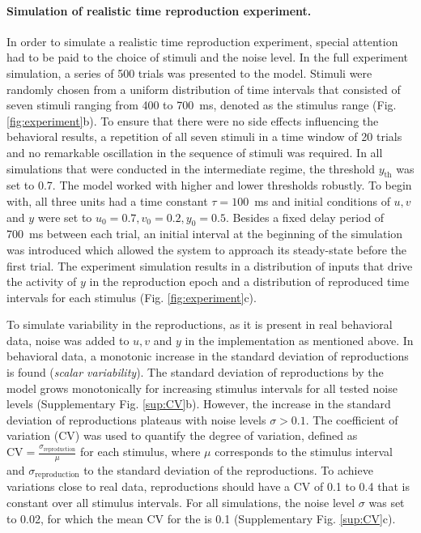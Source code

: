 \documentclass[10pt, a4paper]{article}
\begin{document}
\paragraph{Simulation of realistic time reproduction experiment.}
In order to simulate a realistic time reproduction experiment, special attention had to be paid to the choice of stimuli and the noise level.  
In the full experiment simulation, a series of 500 trials was presented to the model.
Stimuli were randomly chosen from a uniform distribution of time intervals that consisted of seven stimuli ranging from 400 to 700~ms, denoted as the stimulus range (Fig. \ref{fig:experiment}b).
To ensure that there were no side effects influencing the behavioral results, a repetition of all seven stimuli in a time window of 20 trials and no remarkable oscillation in the sequence of stimuli was required.
In all simulations that were conducted in the intermediate regime, the threshold $y_\text{th}$ was set to 0.7. The model worked with higher and lower thresholds robustly. 
To begin with, all three units had a time constant $\tau = 100$~ms and initial conditions of $u, v$ and $y$ were set to $u_0=0.7, v_0=0.2, y_0=0.5$.
Besides a fixed delay period of 700~ms between each trial, an initial interval at the beginning of the simulation was introduced which allowed the system to approach its steady-state before the first trial. 
The experiment simulation results in a distribution of inputs that drive the activity of $y$ in the reproduction epoch and a distribution of reproduced time intervals for each stimulus (Fig. \ref{fig:experiment}c).

To simulate variability in the reproductions, as it is present in real behavioral data, noise was added to $u, v$ and $y$ in the implementation as mentioned above. In behavioral data, a monotonic increase in the standard deviation of reproductions is found (\textit{scalar variability}). 
The standard deviation of reproductions by the model grows monotonically for increasing stimulus intervals for all tested noise levels (Supplementary Fig. \ref{sup:CV}b).
However, the increase in the standard deviation of reproductions plateaus with noise levels $\sigma > 0.1$.
The coefficient of variation (CV) was used to quantify the degree of variation, defined as $\text{CV}=\frac{\sigma_\text{reproduction}}{\mu}$ for each stimulus, where $\mu$ corresponds to the stimulus interval and $\sigma_\text{reproduction}$ to the standard deviation of the reproductions. 
To achieve variations close to real data, reproductions should have a CV of 0.1 to 0.4 that is constant over all stimulus intervals.
For all simulations, the noise level $\sigma$ was set to 0.02, for which the mean CV for the is 0.1 (Supplementary Fig. \ref{sup:CV}c).
\end{document}
